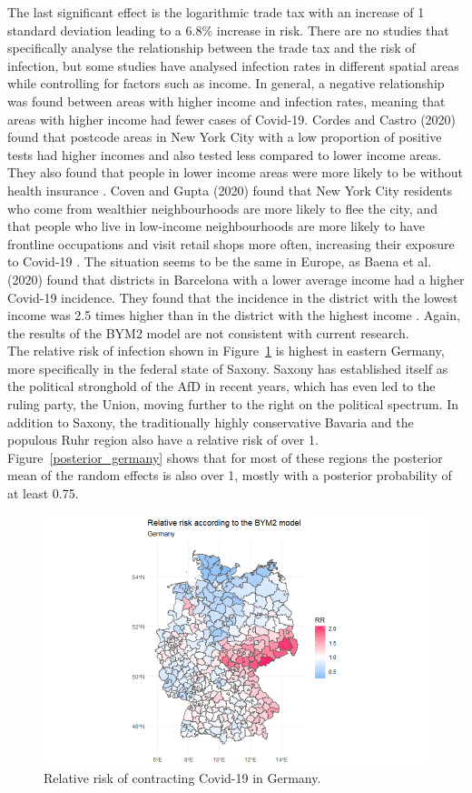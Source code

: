 The last significant effect is the logarithmic trade tax with an increase of 1 standard deviation leading to a 6.8\% increase in risk. There are no studies that specifically analyse the relationship between the trade tax and the risk of infection, but some studies have analysed infection rates in different spatial areas while controlling for factors such as income. In general, a negative relationship was found between areas with higher income and infection rates, meaning that areas with higher income had fewer cases of Covid-19. Cordes and Castro (2020) found that postcode areas in New York City with a low proportion of positive tests had higher incomes and also tested less compared to lower income areas. They also found that people in lower income areas were more likely to be without health insurance \autocite[][]{cordes2020spatial}. Coven and Gupta (2020) found that New York City residents who come from wealthier neighbourhoods are more likely to flee the city, and that people who live in low-income neighbourhoods are more likely to have frontline occupations and visit retail shops more often, increasing their exposure to Covid-19 \autocite[][]{coven2020disparities}. The situation seems to be the same in Europe, as Baena et al. (2020) found that districts in Barcelona with a lower average income had a higher Covid-19 incidence. They found that the incidence in the district with the lowest income was 2.5 times higher than in the district with the highest income \autocite[][]{baena2020impact}. Again, the results of the BYM2 model are not consistent with current research. \\
The relative risk of infection shown in Figure~\ref{rr_germany} is highest in eastern Germany, more specifically in the federal state of Saxony. Saxony has established itself as the political stronghold of the AfD in recent years, which has even led to the ruling party, the Union, moving further to the right on the political spectrum. In addition to Saxony, the traditionally highly conservative Bavaria and the populous Ruhr region also have a relative risk of over 1. Figure~\ref{posterior_germany} shows that for most of these regions the posterior mean of the random effects is also over 1, mostly with a posterior probability of at least 0.75.
\begin{figure}[H]
  \centering
  \includegraphics[width = \textwidth]{relative_risk_germany.png}
  \caption{Relative risk of contracting Covid-19 in Germany.}
  \label{rr_germany}
\end{figure}
